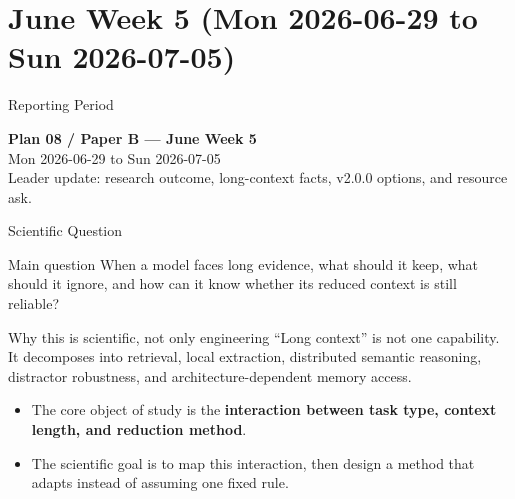 
\section{June Week 5 (Mon 2026-06-29 to Sun 2026-07-05)}

\begin{frame}{Reporting Period}
  \begin{center}
    \textbf{Plan 08 / Paper B --- June Week 5} \\[0.3em]
    \small Mon 2026-06-29 to Sun 2026-07-05 \\
    \scriptsize Leader update: research outcome, long-context facts, v2.0.0 options, and resource ask.
  \end{center}
\end{frame}

\begin{frame}{Scientific Question}
  \small
  \begin{block}{Main question}
    When a model faces long evidence, what should it keep, what should it ignore,
    and how can it know whether its reduced context is still reliable?
  \end{block}
  \begin{block}{Why this is scientific, not only engineering}
    ``Long context'' is not one capability. It decomposes into retrieval,
    local extraction, distributed semantic reasoning, distractor robustness, and
    architecture-dependent memory access.
  \end{block}
  \begin{itemize}
    \item The core object of study is the \textbf{interaction between task type, context length, and reduction method}.
    \item The scientific goal is to map this interaction, then design a method
      that adapts instead of assuming one fixed rule.
  \end{itemize}
\end{frame}


